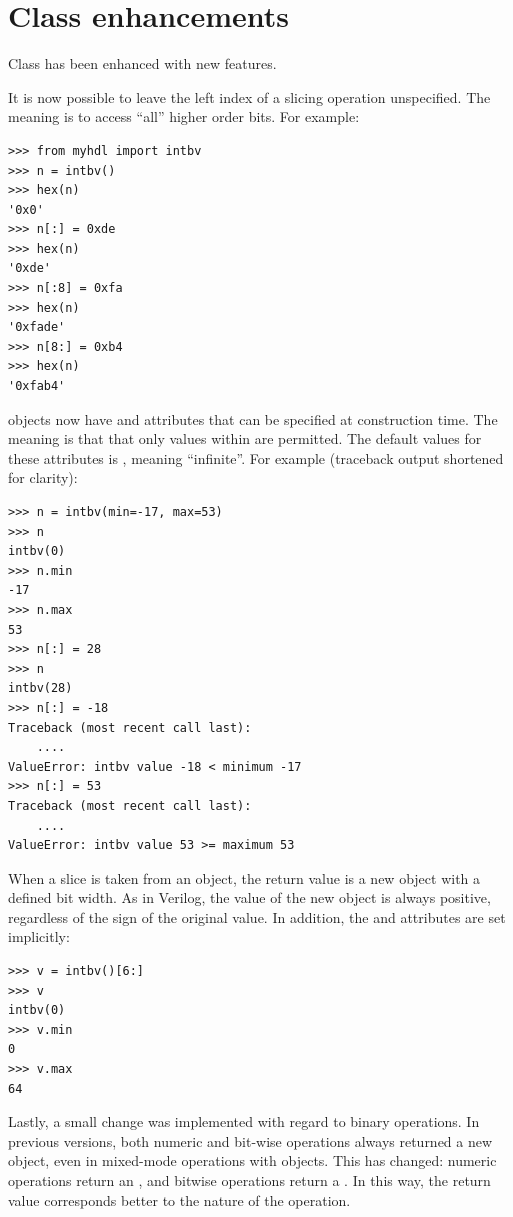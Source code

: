 \documentclass{howto}
\begin{document}
\section{Class  enhancements\label{section-intbv}}

Class  has been enhanced with new features.

It is now possible to leave the left index of a slicing operation
unspecified. The meaning is to access ``all'' higher order bits. For
example:

\begin{verbatim}
>>> from myhdl import intbv
>>> n = intbv()
>>> hex(n)
'0x0'
>>> n[:] = 0xde
>>> hex(n)
'0xde'
>>> n[:8] = 0xfa
>>> hex(n)
'0xfade'
>>> n[8:] = 0xb4
>>> hex(n)
'0xfab4'
\end{verbatim}

 objects now have  and  attributes
that can be specified at construction time. The meaning is that that
only values within  are permitted. The default
values for these attributes is , meaning ``infinite''. For
example (traceback output shortened for clarity):

\begin{verbatim}
>>> n = intbv(min=-17, max=53)
>>> n
intbv(0)
>>> n.min
-17
>>> n.max
53
>>> n[:] = 28
>>> n
intbv(28)
>>> n[:] = -18
Traceback (most recent call last):
    ....
ValueError: intbv value -18 < minimum -17
>>> n[:] = 53
Traceback (most recent call last):
    ....
ValueError: intbv value 53 >= maximum 53
\end{verbatim}

When a slice is taken from an  object, the return value
is a new  object with a defined bit width. As in
Verilog, the value of the new  object is always
positive, regardless of the sign of the original value. In addition,
the  and  attributes are set implicitly:

\begin{verbatim}
>>> v = intbv()[6:]
>>> v
intbv(0)
>>> v.min
0
>>> v.max
64
\end{verbatim}

Lastly, a small change was implemented with regard to 
binary operations. In previous versions, both numeric
and bit-wise operations always returned a new 
object, even in mixed-mode operations with 
objects. This has changed: numeric operations 
return an , and bitwise operations return
a . In this way, the return value corresponds
better to the nature of the operation.
\end{document}
